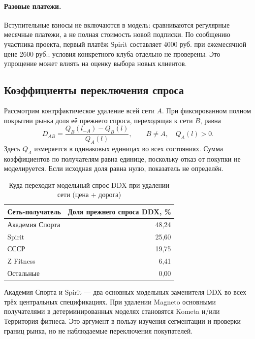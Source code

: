 \documentclass[12pt,a4paper]{article}
\begin{document}
\paragraph{Разовые платежи.} Вступительные взносы не включаются в модель: сравниваются регулярные месячные платежи, а не полная стоимость новой подписки. По сообщению участника проекта, первый платёж Spirit составляет 4000 руб. при ежемесячной цене 2600 руб.; условия конкретного клуба отдельно не проверены. Это упрощение может влиять на оценку выбора новых клиентов.

\subsection{Коэффициенты переключения спроса}
Рассмотрим контрфактическое удаление всей сети $A$. При фиксированном полном покрытии рынка доля её прежнего спроса, переходящая к сети $B$, равна
\begin{equation}
 D_{AB}=\frac{Q_B(l_{-A})-Q_B(l)}{Q_A(l)},\qquad B\ne A,\quad Q_A(l)>0.
\end{equation}
Здесь $Q_A$ измеряется в одинаковых единицах во всех состояниях. Сумма коэффициентов по получателям равна единице, поскольку отказ от покупки не моделируется. Если исходная доля равна нулю, показатель не определён.
\begin{table}[H]\centering\caption{Куда переходит модельный спрос DDX при удалении сети (цена + дорога)}\small\begin{tabular}{lr}\toprule Сеть-получатель & Доля прежнего спроса DDX, \%\\\midrule Академия Спорта & 48,24\\ Spirit & 25,60\\ СССР & 19,75\\ Z Fitness & 6,41\\ Остальные & 0,00\\\bottomrule\end{tabular}\end{table}
Академия Спорта и Spirit --- два основных модельных заменителя DDX во всех трёх центральных спецификациях. При удалении Magneto основными получателями в детерминированных моделях становятся Kometa и/или Территория фитнеса. Это аргумент в пользу изучения сегментации и проверки границ рынка, но не наблюдаемые переключения покупателей.
\end{document}
